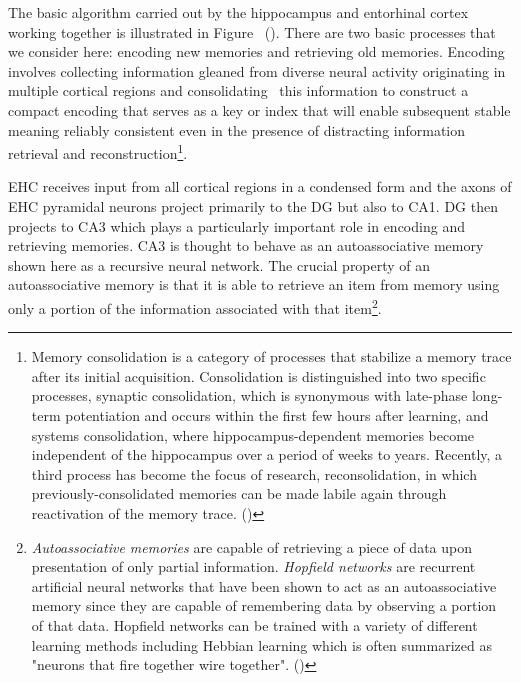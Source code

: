 The basic algorithm carried out by the hippocampus and entorhinal cortex working together is illustrated in Figure~{} ({}). There are two basic processes that we consider here: encoding new memories and retrieving old memories. Encoding involves collecting information gleaned from diverse neural activity originating in multiple cortical regions and consolidating~\cite{MorrisetalNEURON-06} this information to construct a compact encoding that serves as a key or index that will enable subsequent stable \emdash{} meaning reliably consistent even in the presence of distracting information~\cite{EisenbergetalSCIENCE-03} \emdash{} retrieval and reconstruction\footnote{%
%
   Memory consolidation is a category of processes that stabilize a memory trace after its initial acquisition. Consolidation is distinguished into two specific processes, synaptic consolidation, which is synonymous with late-phase long-term potentiation and occurs within the first few hours after learning, and systems consolidation, where hippocampus-dependent memories become independent of the hippocampus over a period of weeks to years. Recently, a third process has become the focus of research, reconsolidation, in which previously-consolidated memories can be made labile again through reactivation of the memory trace. ({})}.

EHC receives input from all cortical regions in a condensed form and the axons of EHC pyramidal neurons project primarily to the DG but also to CA1. DG then projects to CA3 which plays a particularly important role in encoding and retrieving memories. CA3 is thought to behave as an autoassociative memory shown here as a recursive neural network. The crucial property of an autoassociative memory is that it is able to retrieve an item from memory using only a portion of the information associated with that item\footnote{%
% 
  {\it{Autoassociative memories}} are capable of retrieving a piece of data upon presentation of only partial information. {\it{Hopfield networks}} are recurrent artificial neural networks that have been shown to act as an autoassociative memory since they are capable of remembering data by observing a portion of that data. Hopfield networks can be trained with a variety of different learning methods including Hebbian learning which is often summarized as "neurons that fire together wire together". ({})}. 

